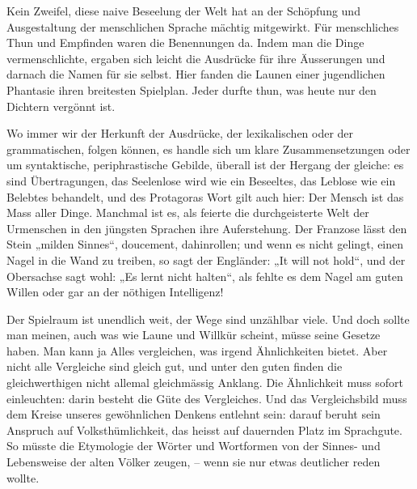 Kein Zweifel, diese naive Beseelung der Welt hat an der Schöpfung und Ausgestaltung der menschlichen Sprache mächtig mitgewirkt. Für menschliches Thun und Empfinden waren die Benennungen da. Indem man die Dinge vermenschlichte, ergaben sich leicht die Ausdrücke für ihre Äusserungen und darnach die Namen für sie selbst. Hier fanden die Launen einer jugendlichen Phantasie ihren breitesten Spielplan. Jeder durfte thun, was heute nur den Dichtern vergönnt ist.

Wo immer wir der Herkunft der Ausdrücke, der lexikalischen oder der grammatischen, folgen können, es handle sich um klare Zusammensetzungen oder um syntaktische, periphrastische Gebilde, überall ist der Hergang der gleiche: es sind Übertragungen, das Seelenlose wird wie ein Beseeltes, das Leblose wie ein Belebtes behandelt, und des Protagoras Wort gilt auch hier: Der Mensch ist das Mass aller Dinge. Manchmal ist es, als feierte die durchgeisterte Welt der Urmenschen in den jüngsten Sprachen ihre Auferstehung. Der Franzose lässt den Stein „milden \label{fp.307} Sinnes“, doucement, dahinrollen; und wenn es nicht gelingt, einen Nagel in die Wand zu treiben, so sagt der Engländer: „It will not hold“, und der Obersachse sagt wohl: „Es lernt nicht halten“, als fehlte es dem Nagel am guten Willen oder gar an der nöthigen Intelligenz! 




Der Spielraum ist unendlich weit, der Wege sind unzählbar viele. Und doch sollte man meinen, auch was wie Laune und Willkür scheint, müsse seine Gesetze haben. Man kann ja Alles vergleichen, was irgend Ähnlichkeiten bietet. Aber nicht alle Vergleiche sind gleich gut, und unter den guten finden die gleichwerthigen nicht allemal gleichmässig Anklang. Die Ähnlichkeit muss sofort \label{sp.317} einleuchten: darin besteht die Güte des Vergleiches. Und das Vergleichsbild muss dem Kreise unseres gewöhnlichen Denkens entlehnt sein: darauf beruht sein Anspruch auf Volksthümlichkeit, das heisst auf dauernden Platz im Sprachgute. So müsste die Etymologie der Wörter und Wortformen von der Sinnes- und Lebensweise der alten Völker zeugen, – wenn sie nur etwas deutlicher reden wollte.

